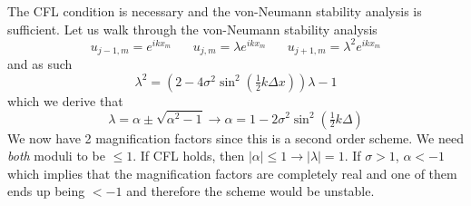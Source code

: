 \documentclass{article}
\newcommand{\twen}{\hspace{20pt}}
\numberwithin{equation}{section}
\begin{document}
The CFL condition is necessary and the von-Neumann stability analysis is sufficient. Let us walk through the von-Neumann stability analysis 
\begin{equation*}
    u_{j-1,m}=e^{ikx_m} \twen u_{j,m}=\lambda e^{ikx_m} \twen u_{j+1,m}=\lambda^2 e^{ikx_m}
\end{equation*}
and as such 
\begin{equation*}
    \lambda^2=\left(2-4\sigma^2 \sin^2\left( \tfrac{1}{2} k\Delta x\right)\right) \lambda -1
\end{equation*}
which we derive that 
\begin{equation*}
    \lambda = \alpha \pm \sqrt{\alpha^2-1} \rightarrow \alpha =1-2\sigma^2\sin^2\left(\tfrac{1}{2}k\Delta \right)
\end{equation*}
We now have 2 magnification factors since this is a second order scheme. We need \emph{both} moduli to be $\leq 1$. If CFL holds, then $|\alpha|\leq 1 \rightarrow |\lambda|=1$. If $\sigma>1$, $\alpha<-1$ which implies that the magnification factors are completely real and one of them ends up being $<-1$ and therefore the scheme would be unstable.
\end{document}
